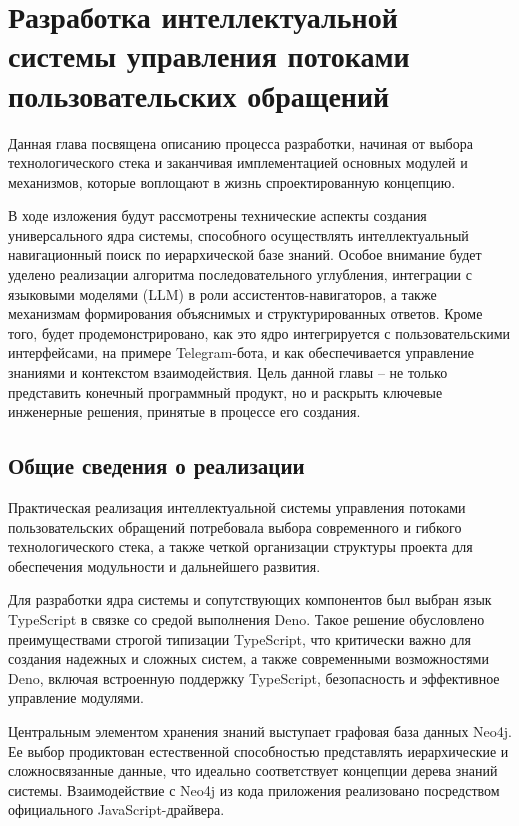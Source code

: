 \section{Разработка интеллектуальной системы управления потоками пользовательских обращений}
\label{sec:development}

Данная глава посвящена описанию процесса разработки, начиная от выбора технологического стека и заканчивая имплементацией основных модулей и механизмов, которые воплощают в жизнь спроектированную концепцию.

В ходе изложения будут рассмотрены технические аспекты создания универсального ядра системы, способного осуществлять интеллектуальный навигационный поиск по иерархической базе знаний. Особое внимание будет уделено реализации алгоритма последовательного углубления, интеграции с языковыми моделями (LLM) в роли ассистентов-навигаторов, а также механизмам формирования объяснимых и структурированных ответов. Кроме того, будет продемонстрировано, как это ядро интегрируется с пользовательскими интерфейсами, на примере Telegram-бота, и как обеспечивается управление знаниями и контекстом взаимодействия. Цель данной главы – не только представить конечный программный продукт, но и раскрыть ключевые инженерные решения, принятые в процессе его создания.

\subsection{Общие сведения о реализации}

Практическая реализация интеллектуальной системы управления потоками пользовательских обращений потребовала выбора современного и гибкого технологического стека, а также четкой организации структуры проекта для обеспечения модульности и дальнейшего развития.

Для разработки ядра системы и сопутствующих компонентов был выбран язык TypeScript в связке со средой выполнения Deno. Такое решение обусловлено преимуществами строгой типизации TypeScript, что критически важно для создания надежных и сложных систем, а также современными возможностями Deno, включая встроенную поддержку TypeScript, безопасность и эффективное управление модулями.

Центральным элементом хранения знаний выступает графовая база данных Neo4j. Ее выбор продиктован естественной способностью представлять иерархические и сложносвязанные данные, что идеально соответствует концепции дерева знаний системы. Взаимодействие с Neo4j из кода приложения реализовано посредством официального JavaScript-драйвера.


